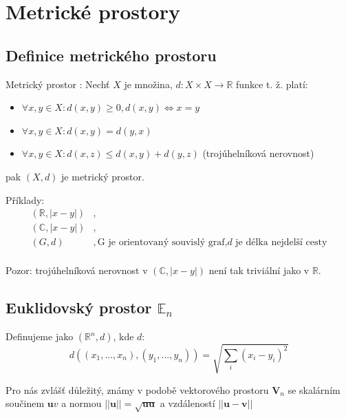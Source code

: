 \documentclass[../main.tex]{subfiles}
\begin{document}
\section{Metrické prostory}
\subsection{Definice metrického prostoru}
\hspace{1.2mm}
Metrický prostor : Nechť $X$ je množina,  $d: X \times X \rightarrow \mathbb{R}$ funkce t. ž. platí:

\begin{itemize}
\item{$\forall x,y \in X : d(x,y) \geq 0, d(x,y) \iff x = y$ }
\item{$\forall x,y \in X : d(x,y) = d(y,x)$}
\item{$\forall x,y \in X : d(x,z) \leq d(x,y) + d(y,z)$ (trojúhelníková nerovnost)}
\end{itemize}
pak $(X,d)$ je metrický prostor.

\noindent
\hspace{1.2mm}
Příklady:
\begin{align*} 
    (\mathbb{R}, |x-y|) &,\\
    (\mathbb{C},|x-y|) &,\\
    (G,d) &, \text{G je orientovaný souvislý graf,} d \text{ je délka nejdelší cesty}\\
\end{align*}

\hspace{1.2mm}
Pozor: trojúhelníková nerovnost v $(\mathbb{C}, |x-y|)$ není tak triviální jako v $\mathbb{R}$.

\subsection{Euklidovský prostor $\mathbb{E}_n$}
\hspace{1.2mm}
Definujeme jako $(\mathbb{R}^n,d)$, kde $d$:
\[d((x_1,...,x_n),(y_1,...,y_n)) = \sqrt{\sum_i(x_i-y_i)^2}\]

Pro nás zvlášť důležitý, známy v podobě vektorového prostoru $\textbf{V}_n$ se skalárním součinem $\textbf{u}v$ a normou
$||\textbf{u}|| = \sqrt{\textbf{uu}}$ a vzdáleností $||\textbf{u}-\textbf{v}||$
\noindent
\end{document}
